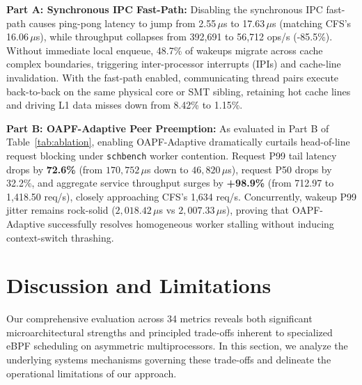 \documentclass[conference]{IEEEtran}
\begin{document}
\textbf{Part A: Synchronous IPC Fast-Path:} Disabling the synchronous IPC fast-path causes ping-pong latency to jump from 2.55\,$\mu$s to 17.63\,$\mu$s (matching CFS's 16.06\,$\mu$s), while throughput collapses from 392,691 to 56,712 ops/s (-85.5\%). Without immediate local enqueue, 48.7\% of wakeups migrate across cache complex boundaries, triggering inter-processor interrupts (IPIs) and cache-line invalidation. With the fast-path enabled, communicating thread pairs execute back-to-back on the same physical core or SMT sibling, retaining hot cache lines and driving L1 data misses down from 8.42\% to 1.15\%.

\textbf{Part B: OAPF-Adaptive Peer Preemption:} As evaluated in Part B of Table~\ref{tab:ablation}, enabling OAPF-Adaptive dramatically curtails head-of-line request blocking under \texttt{schbench} worker contention. Request P99 tail latency drops by \textbf{72.6\%} (from $170{,}752\,\mu$s down to $46{,}820\,\mu$s), request P50 drops by 32.2\%, and aggregate service throughput surges by \textbf{+98.9\%} (from 712.97 to 1,418.50 req/s), closely approaching CFS's 1,634 req/s. Concurrently, wakeup P99 jitter remains rock-solid ($2{,}018.42\,\mu$s vs $2{,}007.33\,\mu$s), proving that OAPF-Adaptive successfully resolves homogeneous worker stalling without inducing context-switch thrashing.

\section{Discussion and Limitations}
\label{sec:discussion}

Our comprehensive evaluation across 34 metrics reveals both significant microarchitectural strengths and principled trade-offs inherent to specialized eBPF scheduling on asymmetric multiprocessors. In this section, we analyze the underlying systems mechanisms governing these trade-offs and delineate the operational limitations of our approach.
\end{document}
